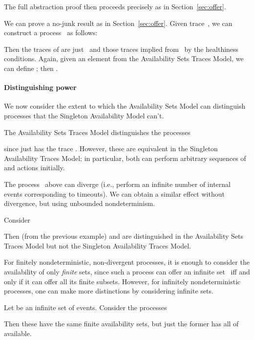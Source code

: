 The full abstraction proof then proceeds precisely as in
Section~\ref{sec:offer}.

We can prove a no-junk result as in Section~\ref{sec:offer}.  Given
trace~, we can  construct a process~ as follows:

Then the traces of  are just~ and those traces implied from~
by the healthiness conditions.  Again, given an element  from the
Availability Sets Traces Model, we can define ; then . 




\paragraph{Distinguishing power}
We now consider the extent to which the Availability Sets Model can
distinguish processes that the Singleton Availability Model can't. 
\begin{example}
\label{example:sets_vs_singles}
The Availability Sets Traces Model distinguishes the processes

since just  has the trace .  However, these are
equivalent in the Singleton Availability Traces Model; in particular, both can
perform 
arbitrary sequences of  and  actions initially.\end{example}
The process~ above can diverge (i.e., perform an infinite number of
internal~ events corresponding to
timeouts).  We can obtain a similar effect without divergence, but using
unbounded nondeterminism.  
\begin{example}
\label{example:sets_vs_singles_2}
Consider 

Then  (from the previous example) and   are distinguished in the
Availability Sets Traces Model but not the Singleton Availability Traces
Model.
\end{example}

For finitely nondeterministic, non-divergent processes, it is enough to
consider the availability of only \emph{finite} sets, since such a process can
offer an infinite set~ iff and only if it can offer all its finite subsets.
However, for infinitely nondeterministic processes, one can make more
distinctions by considering infinite sets.
\begin{example}
\label{example:finite_vs_infinite}
Let  be an infinite set of events.  Consider the processes

Then these have the same finite availability sets, but just the former has
all of~ available.
\end{example}

